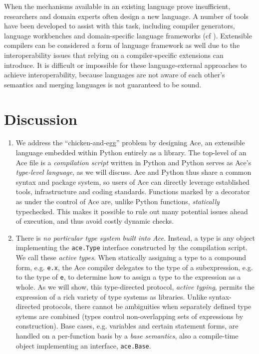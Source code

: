 \documentclass[10pt,preprint]{sigplanconf}
\begin{document}
{When the mechanisms available in an existing language prove insufficient, researchers and domain experts often design a new language. A number of tools have been developed to assist with this task, including compiler generators, language workbenches and domain-specific language frameworks (cf \cite{erdweg2013state}). Extensible compilers can be considered a form of language framework as well due to the interoperability issues that relying on a compiler-specific extensions can introduce. It is difficult or impossible for these language-external approaches to achieve interoperability, because languages are not aware of each other's semantics and merging languages is not guaranteed to be sound.

\section{Discussion}\label{discussion}

\begin{enumerate}
\item We address the ``chicken-and-egg'' problem by designing Ace, an extensible language  embedded within Python \cite{Politz:2013:PFM:2509136.2509536,python} entirely as a library. The top-level of an Ace file is a \emph{compilation script} written in Python and Python serves as Ace's \emph{type-level language}, as we will discuss.  Ace and Python thus share a common syntax and package system, so users of Ace can directly leverage established tools, infrastructure and coding standards. Functions marked by a decorator as under the control of Ace are, unlike Python functions, \emph{statically} typechecked. This makes it possible to rule out many potential issues ahead of execution, and thus  avoid  costly dynamic checks. %
\item  %
There is \emph{no particular type system built into Ace}. Instead, a type is any  object implementing the \verb|ace.Type| interface constructed by the compilation script. We call these \emph{active types}. When statically assigning a type to a compound form, e.g. \verb|e.x|, the Ace {compiler} delegates to the type of a subexpression, e.g. to the type of \verb|e|, to determine how to assign a type to the expression as a whole. As we will show, this {type-directed protocol}, \emph{active typing}, permits the expression of a rich variety of type systems as libraries. Unlike syntax-directed protocols, there cannot be ambiguities when separately defined type sytems are combined (types control non-overlapping sets of expressions by construction). Base cases, e.g.  variables and certain statement forms, are handled on a {per-function basis} by a \emph{base semantics}, also a compile-time object implementing an interface, \verb|ace.Base|.
\end{enumerate}

}
\end{document}
